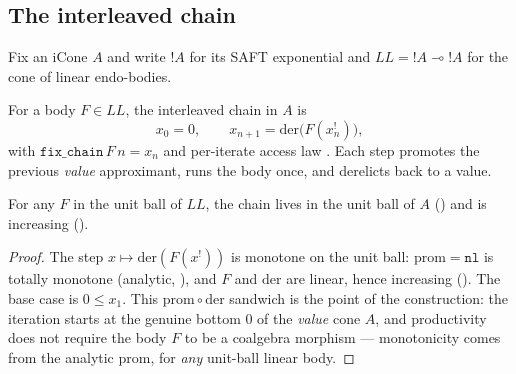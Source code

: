 \subsection{The interleaved chain}%
\label{ssec:cbv-fix-chain}

Fix an iCone $A$ and write $\mathord{!}A$ for its SAFT exponential and
$LL = \mathord{!}A \multimap \mathord{!}A$ for the cone of linear
endo-bodies.

\begin{definition}%
\label{def:cbv-fix-chain}
\rocqok
{}\rocqok
{}
For a body $F \in LL$, the interleaved chain in $A$ is
\[
  x_0 = 0,
  \qquad
  x_{n+1} = \mathrm{der}\bigl(F(x_n^!)\bigr),
\]
with $\mathtt{fix\_chain}\,F\,n = x_n$ and per-iterate access law
. Each step
promotes the previous \emph{value} approximant, runs the body once,
and derelicts back to a value.
\end{definition}

\begin{lemma}\label{lem:cbv-fix-chain-laws}
\rocqok
{}\rocqok
{}
For any $F$ in the unit ball of $LL$, the chain lives in the unit ball
of $A$ () and
is increasing
().
\end{lemma}

\begin{proof}
The step $x \mapsto \mathrm{der}(F(x^!))$ is monotone on the unit ball:
$\mathrm{prom} = \mathtt{nl}$ is totally monotone (analytic,
), and $F$ and
$\mathrm{der}$ are linear, hence increasing
(). The base
case is $0 \leq x_1$. This $\mathrm{prom}\circ\mathrm{der}$ sandwich is
the point of the construction: the iteration starts at the genuine
bottom $0$ of the \emph{value} cone $A$, and productivity does not
require the body $F$ to be a coalgebra morphism --- monotonicity comes
from the analytic $\mathrm{prom}$, for \emph{any} unit-ball linear
body.
\end{proof}

